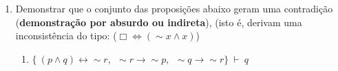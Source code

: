 \documentclass[12pt, a4paper,final]{article}
\begin{document}
\begin{enumerate}
\begin{enumerate}
\end{enumerate}



\item Demonstrar que o conjunto das proposi\c c\~oes abaixo geram uma contradi\c c\~ao ({\bf demons\-tra\c c\~ao por absurdo ou indireta}),  (isto \'e, derivam uma inconsist\^encia do tipo: ($\Box \Leftrightarrow (\sim x \wedge x)$)

\begin{enumerate}

\item $\{\ (p \wedge q) \leftrightarrow \sim r, \:\:  \sim r \rightarrow \sim p, \:\: \sim q \rightarrow \sim r   \} ~\vdash~   q $















\end{enumerate}

\end{enumerate}
\end{document}

